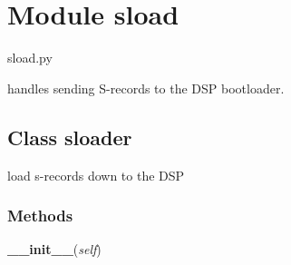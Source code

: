 %
%
%


\section{Module sload}

    \label{sload}
sload.py

handles sending S-records to the DSP bootloader.



\subsection{Class sloader}

    \label{sload:sloader}
load s-records down to the DSP



  \subsubsection{Methods}

    \label{sload:sloader:__init__}

    \vspace{0.5ex}

    \begin{boxedminipage}{\textwidth}

    \raggedright \textbf{\_\_init\_\_}(\textit{self})

    \end{boxedminipage}


